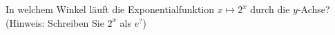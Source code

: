 \item  In welchem Winkel läuft die Exponentialfunktion $x \mapsto 2^x$ durch die $y$-Achse? (Hinweis: Schreiben Sie $2^x$ als $e^?$)

